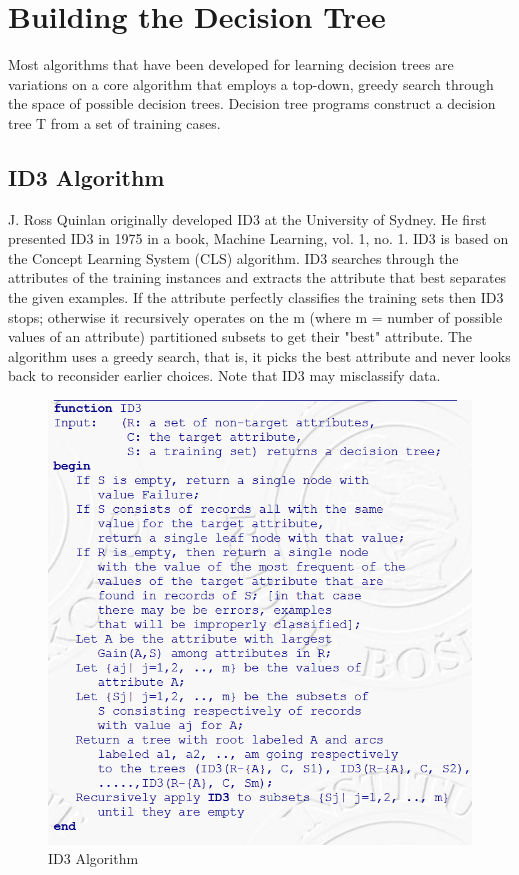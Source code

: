 \documentclass[12pt]{report}
\begin{document}
\section{Building the Decision Tree}

Most algorithms that have been developed for learning decision trees are variations on a core algorithm that employs a top-down, greedy search through the space of possible decision trees. Decision tree programs construct a decision tree T from a set of training cases.


\subsection{ID3 Algorithm}
J. Ross Quinlan originally developed ID3 at the University of Sydney. He first presented ID3 in 1975 in a book, Machine Learning, vol. 1, no. 1. ID3 is based on the Concept Learning System (CLS) algorithm. ID3 searches through the attributes of the training instances and extracts the attribute that best separates the given examples. If the attribute perfectly classifies the training sets then ID3 stops; otherwise it recursively operates on the m (where m = number of possible values of an attribute) partitioned subsets to get their "best" attribute. The algorithm uses a greedy search, that is, it picks the best attribute and never looks back to reconsider earlier choices. Note that ID3 may misclassify data. 


\begin{figure}[h!]
	\centering
		\includegraphics[scale=1.0]{ID3.png}
	\caption{ID3 Algorithm}
	\label{fig:ID3}
\end{figure}
\end{document}
